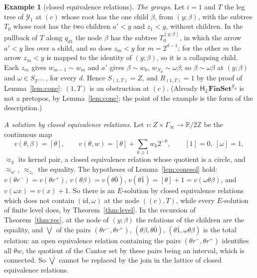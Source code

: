 \documentclass[11pt]{amsart}
\theoremstyle{definition}
\newtheorem{ex}[thm]{Example}
\newcommand{\Fin}{\mathbf{FinSet}}
\newcommand{\HH}{\mathsf H}
\newcommand{\id}{\mathrm{id}}
\begin{document}
\begin{ex}[closed equivalence relations]
\emph{The groups.} Let $i=1$ and $T$ the leg tree of $\mathcal Y_1$
at $(c)$ whose root has the one child $\beta$, from $(y;\beta)$, with
the subtree $T_0$ whose root has the two children $a'<y$ and $z_1<y$,
without children. In the pullback of $T$ along $q_{d1}$ the node
$\beta$ has the subtree $T_0^{(y;\beta)}$, in which the arrow $a'<y$
lies over a child, and so does $z_m<y$ for $m=2^{d-1}$; for the other
$m$ the arrow $z_m<y$ is mapped to the identity of $(y;\beta)$, so it
is a collapsing child. Each $z_m$ gives $w_{m-1}\sim w_m$ and $a'$
gives $\beta\sim w_0$, $w_{N_d}\sim\omega\beta$; so
$\beta\sim\omega\beta$ at $(y;\beta)$ and $\omega\in S_{T^{(c)}}$,
for every $d$. Hence $S_{(1,T)}=Z$, and $R_{(1,T)}=1$ by the proof of
Lemma~\ref{lem:cone}: $(1,T)$ is an obstruction at $(c)$. (Already
$\HH_L\Fin^{\mathcal Y_d}$ is not a pretopos, by
Lemma~\ref{lem:cone}; the point of the example is the form of the
description.)

\emph{A solution by closed equivalence relations.} Let $v\colon
Z\times\Gamma_\infty\to\mathbb R/2\mathbb Z$ be the continuous map
\[
v(\theta,\beta)=[\theta],\qquad v(\theta,w)=[\theta]+
\textstyle\sum_{k\ge1}w_k2^{-k},\qquad[1]=0,\ [\omega]=1,
\]
$\approx_y$ its kernel pair, a closed equivalence relation whose
quotient is a circle, and $\approx_{a'}$, $\approx_{z_r}$ the
equality. The hypotheses of Lemma~\ref{lem:conesol} hold: $v(\theta
r^-)=v(\theta r^+)$, $v(\theta\beta)=v(\theta\bar0)$,
$v(\theta\bar1)=[\theta]+1=v(\omega\theta\beta)$, and $v(\omega
x)=v(x)+1$. So there is an $E$-solution by closed equivalence
relations which does not contain $(\id,\omega)$ at the node
$((c),T)$, while every $E$-solution of finite level does, by
Theorem~\ref{thm:level}. In the recursion of Theorem~\ref{thm:rec},
at the node of $(y;\beta)$ the relations of the children are the
equality, and $\widehat\bigvee$ of the pairs $(\theta r^-,\theta
r^+)$, $(\theta\beta,\theta\bar0)$, $(\theta\bar1,\omega\theta\beta)$
is the total relation: an open equivalence relation containing the
pairs $(\theta r^-,\theta r^+)$ identifies all $\theta w$, the
quotient of the Cantor set by these pairs being an interval, which is
connected. So $\widehat\bigvee$ cannot be replaced by the join in the
lattice of closed equivalence relations.
\end{ex}
\end{document}
